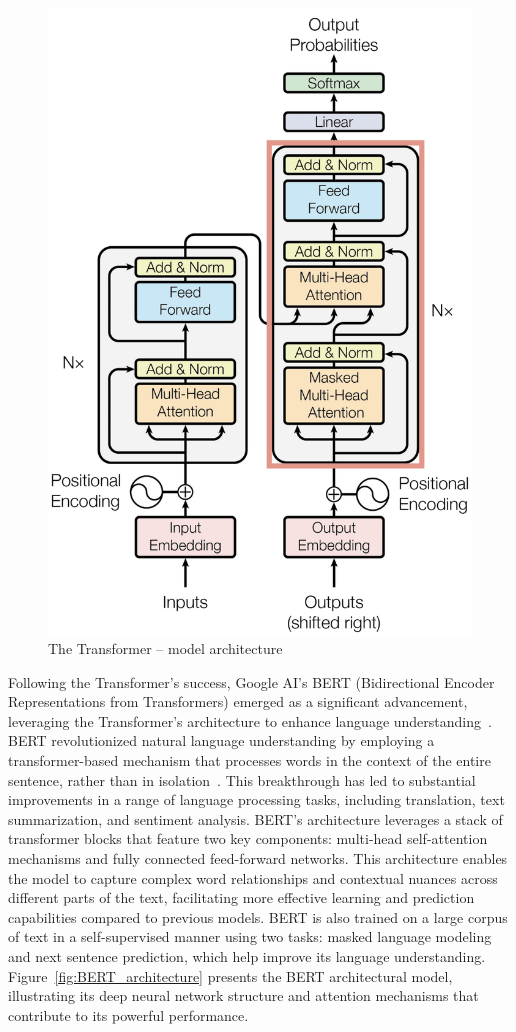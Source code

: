 \begin{figure}
	\centering
	\includegraphics[width=0.8\linewidth]{figures/transformer_architecture}
	\caption[Transformer Architecture]{The Transformer -- model architecture~\cite{vaswani2017_Attention}}
	\label{fig:Transformer_Architecture}
\end{figure}

Following the Transformer's success, Google AI's BERT (Bidirectional Encoder Representations from Transformers) emerged as a significant advancement, leveraging the Transformer's architecture to enhance language understanding~\cite{devlin2018_BERT}. BERT revolutionized natural language understanding by employing a transformer-based mechanism that processes words in the context of the entire sentence, rather than in isolation~\cite{devlin2018_BERT}. This breakthrough has led to substantial improvements in a range of language processing tasks, including translation, text summarization, and sentiment analysis. BERT's architecture leverages a stack of transformer blocks that feature two key components: multi-head self-attention mechanisms and fully connected feed-forward networks. This architecture enables the model to capture complex word relationships and contextual nuances across different parts of the text, facilitating more effective learning and prediction capabilities compared to previous models. BERT is also trained on a large corpus of text in a self-supervised manner using two tasks: masked language modeling and next sentence prediction, which help improve its language understanding. Figure~\ref{fig:BERT_architecture} presents the BERT architectural model, illustrating its deep neural network structure and attention mechanisms that contribute to its powerful performance.

